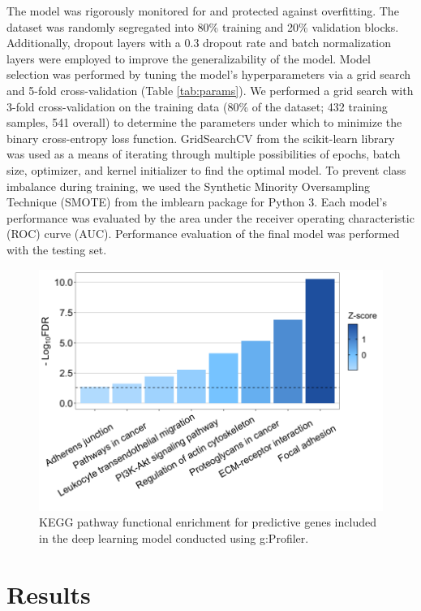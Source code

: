 \documentclass[10pt, letterpaper]{article}
\begin{document}
\begin{multicols}{2}
The model was rigorously monitored for and protected against overfitting. The dataset was randomly segregated into 80\% training and 20\% validation blocks. Additionally, dropout layers with a 0.3 dropout rate and batch normalization layers were employed to improve the generalizability of the model. Model selection was performed by tuning the model’s hyperparameters via a grid search and 5-fold cross-validation (Table \ref{tab:params}). We performed a grid search with 3-fold cross-validation on the training data (80\% of the dataset; 432 training samples, 541 overall) to determine the parameters under which to minimize the binary cross-entropy loss function. GridSearchCV from the scikit-learn library was used as a means of iterating through multiple possibilities of epochs, batch size, optimizer, and kernel initializer to find the optimal model. To prevent class imbalance during training, we used the Synthetic Minority Oversampling Technique (SMOTE) from the imblearn package for Python 3. Each model’s performance was evaluated by the area under the receiver operating characteristic (ROC) curve (AUC). Performance evaluation of the final model was performed with the testing set.


\begin{figure}[!ht]
    \centering
    \includegraphics[width=\textwidth]{Figures/kegg.png}
    \caption{KEGG pathway functional enrichment for predictive genes included in the deep learning model conducted using g:Profiler.}
    \label{fig:kegg}
\end{figure}



\section{Results}


\end{multicols}
\end{document}
